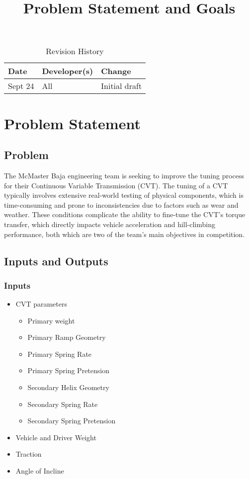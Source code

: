 \documentclass{article}
\title{Problem Statement and Goals\\\progname}
\author{\authname}
\date{}
\begin{document}
\maketitle

\begin{table}[hp]
\caption{Revision History} \label{TblRevisionHistory}
\begin{tabularx}{\textwidth}{llX}
\toprule
\textbf{Date} & \textbf{Developer(s)} & \textbf{Change}\\
\midrule
Sept 24 & All & Initial draft\\
\bottomrule
\end{tabularx}
\end{table}

\section{Problem Statement}

\subsection{Problem}
The McMaster Baja engineering team is seeking to improve the tuning process for their Continuous Variable Transmission (CVT). The tuning of a CVT typically involves extensive real-world testing of physical components, which is time-consuming and prone to inconsistencies due to factors such as wear and weather. These conditions complicate the ability to fine-tune the CVT’s torque transfer, which directly impacts vehicle acceleration and hill-climbing performance, both which are two of the team's main objectives in competition.


\subsection{Inputs and Outputs}

\subsubsection{Inputs}
\begin{itemize}
    \item CVT parameters
    \begin{itemize}
        \item Primary weight
        \item Primary Ramp Geometry
        \item Primary Spring Rate
        \item Primary Spring Pretension
        \item Secondary Helix Geometry
        \item Secondary Spring Rate
        \item Secondary Spring Pretension
    \end{itemize}
    \item Vehicle and Driver Weight
    \item Traction
    \item Angle of Incline
\end{itemize}
\end{document}
